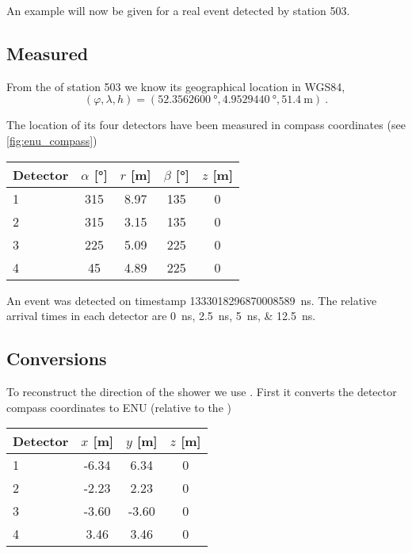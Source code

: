 An example will now be given for a real \hisparc event detected by
station 503.


\subsection{Measured}

From the \gps of station 503 we know its geographical location in WGS84,
%
\begin{equation}
    (\varphi, \lambda, h) = (\SI{52.3562600}{\degree},
                             \SI{4.9529440}{\degree},
                             \SI{51.4}{\meter}) \ .
\end{equation}

The location of its four detectors have been measured in compass
coordinates (see \cref{fig:enu_compass})

\begin{center}
    \begin{tabular}{ l c c c c }
        \toprule
        Detector & $\alpha$ [\si{\degree}] & $r$ [\si{\meter}] &
        $\beta$ [\si{\degree}] & $z$ [\si{\meter}] \\
        \midrule
        1 & 315 & 8.97 & 135 & 0 \\
        2 & 315 & 3.15 & 135 & 0 \\
        3 & 225 & 5.09 & 225 & 0 \\
        4 &  45 & 4.89 & 225 & 0 \\
        \bottomrule
    \end{tabular}
\end{center}

An event was detected on \gps timestamp
\SI{1333018296870008589}{\nano\second}. The relative arrival times in
each detector are \SIlist{0;2.5;5;12.5}{\nano\second}.


\subsection{Conversions}

To reconstruct the direction of the shower we use \sapphire. First it
converts the detector compass coordinates to ENU (relative to the \gps)

\begin{center}
    \begin{tabular}{ l c c c }
        \toprule
        Detector & $x$ [\si{\meter}] & $y$ [\si{\meter}] & $z$ [\si{\meter}] \\
        \midrule
        1 & -6.34 &  6.34 & 0 \\
        2 & -2.23 &  2.23 & 0 \\
        3 & -3.60 & -3.60 & 0 \\
        4 &  3.46 &  3.46 & 0 \\
        \bottomrule
    \end{tabular}
\end{center}

